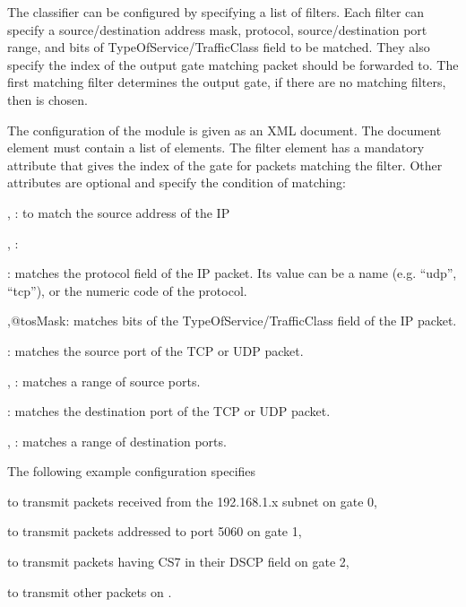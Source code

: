 The classifier can be configured by specifying a list of filters.
Each filter can specify a source/destination address mask, protocol,
source/destination port range, and bits of TypeOfService/TrafficClass
field to be matched. They also specify the index of the output gate
matching packet should be forwarded to. The first matching filter
determines the output gate, if there are no matching filters,
then  is chosen.

The configuration of the module is given as an XML document.
The document element must contain a list of  elements.
The filter element has a mandatory  attribute that gives
the index of the gate for packets matching the filter. Other attributes
are optional and specify the condition of matching:
\begin{compactitem}
  \item {}, : to match the source
    address of the IP
  \item {}, :
  \item {}: matches the protocol field of the IP packet.
    Its value can be a name (e.g. ``udp'', ``tcp''),
    or the numeric code of the protocol.
  \item {},{@tosMask}: matches bits of the TypeOfService/TrafficClass
    field of the IP packet.
  \item {}: matches the source port of the TCP or UDP packet.
  \item {}, : matches a range of source ports.
  \item {}: matches the destination port of the TCP or UDP packet.
  \item {}, : matches a range of
     destination ports.
\end{compactitem}

The following example configuration specifies
\begin{compactitem}
  \item to transmit packets received from the 192.168.1.x subnet on gate 0,
  \item to transmit packets addressed to port 5060 on gate 1,
  \item to transmit packets having CS7 in their DSCP field on gate 2,
  \item to transmit other packets on .
\end{compactitem}

